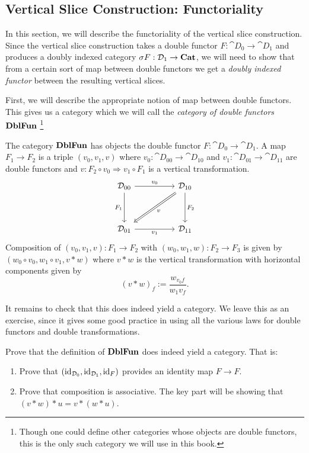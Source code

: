 \documentclass[DynamicalBook]{subfiles}
\begin{document}
\subsection{Vertical Slice Construction: Functoriality}\label{sec.functoriality_vertical_slice}

In this section, we will describe the functoriality of the vertical slice
construction. Since the vertical slice construction takes a double functor $F :
\cat{D}_0 \to \cat{D}_1$ and produces a doubly indexed category $\sigma F :
\mathcal{D}_{1} \to \textbf{Cat}$, we will need to show that from a certain sort of map
between double functors we get a \emph{doubly indexed functor} between the
resulting vertical slices.

First, we will describe the appropriate notion of map between double functors.
This gives us a category which we will call the \emph{category of double
  functors} $\textbf{DblFun}$ \footnote{Though one could define other categories
  whose objects are double
functors, this is the only such category we will use in
this book.}
\begin{definition}
The category $\textbf{DblFun}$ has objects the double functor $F : \cat{D}_0 \to
\cat{D}_1$. A map $F_1 \to F_2$ is a triple $(v_0, v_1, v)$ where $v_0 :
\cat{D}_{00} \to \cat{D}_{10}$ and $v_1 : \cat{D}_{01} \to \cat{D}_{11}$ are
double functors and $v : F_2 \circ v_0 \Rightarrow v_1 \circ F_1$ is a vertical
transformation.
\[
        \begin{tikzcd}
          \cat{D}_{00} \ar[dd, "F_1"'] \ar[rr, "v_0"] & & \cat{D}_{10}
 \ar[dd, "F_2"] \ar[ddll, Rightarrow, "v"] \\
           &  & \\
          \cat{D}_{01} \ar[rr, "v_1"'] & & \cat{D}_{11}
        \end{tikzcd}
\]
Composition of $(v_0, v_1, v) : F_1 \to F_2$ with $(w_0, w_1, w) : F_2 \to F_3$
is given by $(w_0 \circ v_0, w_1 \circ v_1, v \ast w)$ where $v \ast w$ is the
vertical transformation with horizontal components given by
$$(v \ast w)_f := \frac{w_{v_0 f}}{w_1 v_f}.$$
\end{definition}

It remains to check that this does indeed yield a category. We leave this as an
exercise, since it gives some good practice in using all the various laws for
double functors and double transformations.

\begin{exercise}
Prove that the definition of $\textbf{DblFun}$ does indeed yield a category. That
is:
\begin{enumerate}
  \item Prove that $(\mathrm{id}_{\mathcal{D}_0}, \mathrm{id}_{\mathcal{D}_1}, \mathrm{id}_{F})$ provides an
    identity map $F \to F$.
  \item Prove that composition is associative. The key part will be showing that
    $(v \ast w) \ast u = v \ast (w \ast u)$.
\end{enumerate}
\end{exercise}
\end{document}
